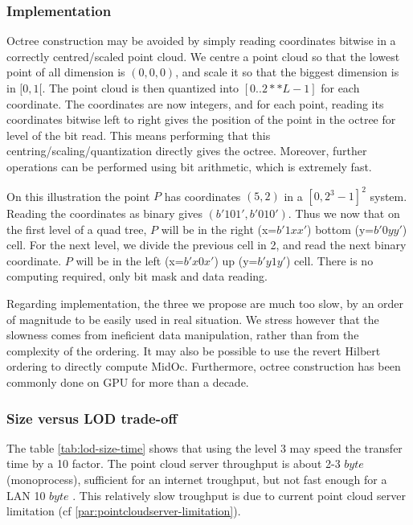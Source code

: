 	\subsubsection{Implementation}
		\label{subsubsec:bit_coordinates}
		Octree construction may be avoided by simply reading coordinates bitwise in a correctly centred/scaled point cloud.
		We centre a point cloud so that the lowest point of all dimension is $(0,0,0)$, and scale it so that the biggest dimension is in $[0,1[$.
		The point cloud is then quantized into $[0..2**L-1]$ for each coordinate.
		The coordinates are now integers, and for each point, reading its coordinates bitwise left to right gives the position of the point in the octree for level of the bit read.
		This means performing that this centring/scaling/quantization directly gives the octree. Moreover, further operations can be performed using bit arithmetic, which is extremely fast.
		
		On this illustration the point $P$ has coordinates $(5,2)$ in a $[0,2^3-1]^2$ system. Reading the coordinates as binary gives $(b'101',b'010')$.
		Thus we now that on the first level of a quad tree, $P$ will be in the right (x=$b'1xx'$) bottom (y=$b'0yy'$) cell.
		For the next level, we divide the previous cell in 2, and read the next binary coordinate. $P$ will be in the left (x=$b'x0x'$) up (y=$b'y1y'$) cell. There is no computing required, only bit mask and data reading.
			
		Regarding implementation, the three we propose are much too slow, by an order of magnitude to be easily used in real situation. We stress however that the slowness comes from ineficient data manipulation, rather than from the complexity of the ordering. 
		It may also be possible to use the revert Hilbert ordering to directly compute MidOc.
		Furthermore, octree construction has been commonly done on GPU for more than a decade.
	 \subsubsection{Size versus LOD trade-off}
		 \label{point-cloud-server-troughput}
		 The table \ref{tab:lod-size-time} shows that using the level 3 may speed the transfer time by a 10 factor.
		 The point cloud server throughput is about 2-3 \mega $byte$ \per \second  (monoprocess),  sufficient for an internet troughput, but not fast enough for a LAN 10 \mega $byte$ \per \second.
		 This relatively slow troughput is due to current point cloud server limitation (cf \ref{par:pointcloudserver-limitation}).
